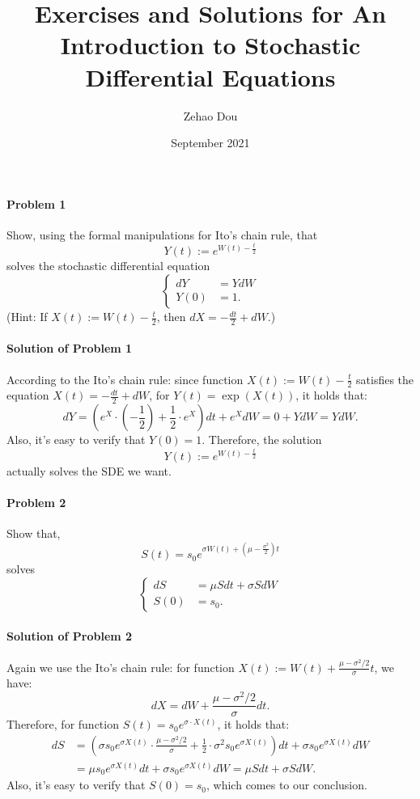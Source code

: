 \documentclass{article}
\title{Exercises and Solutions for \textbf{An Introduction to Stochastic Differential Equations}}
\author{Zehao Dou}
\date{September 2021}
\begin{document}
\allowdisplaybreaks[4]
\maketitle

\newpage
\paragraph{Problem 1} Show, using the formal manipulations for Ito's chain rule, that
\[Y(t) := e^{W(t)-\frac{t}{2}}\]
solves the stochastic differential equation
\begin{equation*}
\begin{cases}
dY &= YdW\\
Y(0) &= 1.
\end{cases} 
\end{equation*}
(Hint: If $X(t):=W(t)-\frac{t}{2}$, then $dX=-\frac{dt}{2}+dW$.)

\paragraph{Solution of Problem 1}
According to the Ito's chain rule: since function $X(t):=W(t)-\frac{t}{2}$ satisfies the equation $X(t)=-\frac{dt}{2}+dW$, for $Y(t)=\exp(X(t))$, it holds that:
\[dY=\left(e^{X}\cdot\left(-\frac{1}{2}\right)+\frac12\cdot e^{X}\right)dt+e^{X}dW= 0+YdW=YdW.\]
Also, it's easy to verify that $Y(0)=1$. Therefore, the solution
\[Y(t) := e^{W(t)-\frac{t}{2}}\]
actually solves the SDE we want. 

\paragraph{Problem 2} Show that, 
\[S(t)=s_0e^{\sigma W(t)+\left(\mu-\frac{\sigma^2}{2}\right)t}\]
solves
\begin{equation*}
\begin{cases}
dS &= \mu Sdt + \sigma SdW\\
S(0) &= s_0.
\end{cases} 
\end{equation*}

\paragraph{Solution of Problem 2}
Again we use the Ito's chain rule: for function $X(t):= W(t)+\frac{\mu-\sigma^2/2}{\sigma}t$, we have:
\[dX= dW + \frac{\mu-\sigma^2/2}{\sigma} dt.\]
Therefore, for function $S(t)=s_0 e^{\sigma\cdot X(t)}$, it holds that:
\begin{equation*}
\begin{aligned}
dS &= \left(\sigma s_0 e^{\sigma X(t)}\cdot \frac{\mu-\sigma^2/2}{\sigma} +\frac12\cdot \sigma^2 s_0 e^{\sigma X(t)}\right)dt + \sigma s_0 e^{\sigma X(t)}dW\\
&= \mu s_0 e^{\sigma X(t)}dt + \sigma s_0 e^{\sigma X(t)}dW = \mu Sdt+\sigma SdW.
\end{aligned}    
\end{equation*}
Also, it's easy to verify that $S(0)=s_0$, which comes to our conclusion. 
\end{document}
